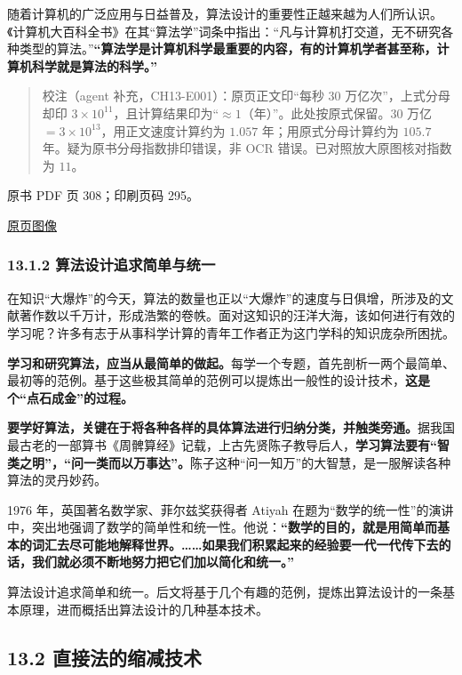 随着计算机的广泛应用与日益普及，算法设计的重要性正越来越为人们所认识。《计算机大百科全书》在其``算法学''词条中指出：``凡与计算机打交道，无不研究各种类型的算法。''\textbf{``算法学是计算机科学最重要的内容，有的计算机学者甚至称，计算机科学就是算法的科学。''}

\begin{quote}
校注（agent 补充，CH13-E001）：原页正文印``每秒 30 万亿次''，上式分母却印 \(3\times10^{11}\)，且计算结果印为``\(\approx1\)（年）''。此处按原式保留。\(30\) 万亿 \(=3\times10^{13}\)，用正文速度计算约为 \(1.057\) 年；用原式分母计算约为 \(105.7\) 年。疑为原书分母指数排印错误，非 OCR 错误。已对照放大原图核对指数为 \(11\)。
\end{quote}

\clearpage

原书 PDF 页 308；印刷页码 295。

\href{source-images/pdf-308.jpeg}{原页图像}

\subsubsection{13.1.2 算法设计追求简单与统一}\label{ch13-ux7b97ux6cd5ux8bbeux8ba1ux8ffdux6c42ux7b80ux5355ux4e0eux7edfux4e00}

在知识``大爆炸''的今天，算法的数量也正以``大爆炸''的速度与日俱增，所涉及的文献著作数以千万计，形成浩繁的卷帙。面对这知识的汪洋大海，该如何进行有效的学习呢？许多有志于从事科学计算的青年工作者正为这门学科的知识庞杂所困扰。

\textbf{学习和研究算法，应当从最简单的做起。}每学一个专题，首先剖析一两个最简单、最初等的范例。基于这些极其简单的范例可以提炼出一般性的设计技术，\textbf{这是个``点石成金''的过程。}

\textbf{要学好算法，关键在于将各种各样的具体算法进行归纳分类，并触类旁通。}据我国最古老的一部算书《周髀算经》记载，上古先贤陈子教导后人，\textbf{学习算法要有``智类之明''，``问一类而以万事达''。}陈子这种``问一知万''的大智慧，是一服解读各种算法的灵丹妙药。

1976 年，英国著名数学家、菲尔兹奖获得者 Atiyah 在题为``数学的统一性''的演讲中，突出地强调了数学的简单性和统一性。他说：\textbf{``数学的目的，就是用简单而基本的词汇去尽可能地解释世界。\ldots\ldots 如果我们积累起来的经验要一代一代传下去的话，我们就必须不断地努力把它们加以简化和统一。''}

算法设计追求简单和统一。后文将基于几个有趣的范例，提炼出算法设计的一条基本原理，进而概括出算法设计的几种基本技术。

\subsection{13.2 直接法的缩减技术}\label{ch13-ux76f4ux63a5ux6cd5ux7684ux7f29ux51cfux6280ux672f}

